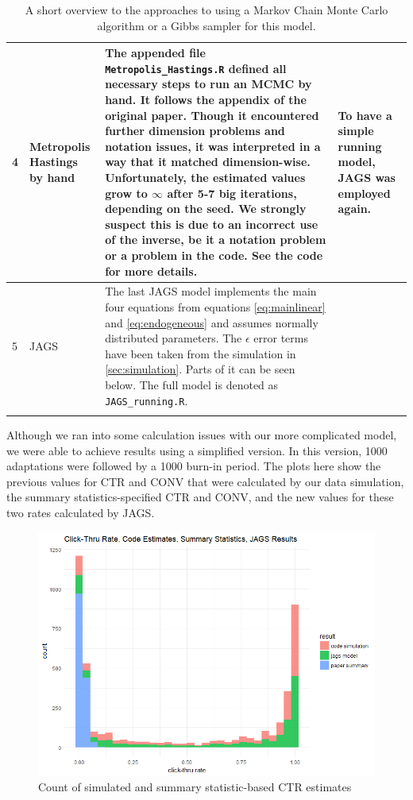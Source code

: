 \begin{longtable}{| p{0.2cm} | p{1.5cm} | p{4.5cm} | p{4.5cm} |}
    \hline
    4 & Metropolis Hastings by hand & The appended file \texttt{Metropolis\_Hastings.R} defined all necessary steps to run an MCMC by hand. It follows the appendix of the original paper. Though it encountered further dimension problems and notation issues, it was interpreted in a way that it matched dimension-wise. Unfortunately, the estimated values grow to $\infty$ after 5-7 big iterations, depending on the seed. We strongly suspect this is due to an incorrect use of the inverse, be it a notation problem or a problem in the code. See the code for more details. & To have a simple running model, JAGS was employed again.\\
    \hline
    5 & JAGS & The last JAGS model implements the main four equations from equations \ref{eq:mainlinear} and \ref{eq:endogeneous} and assumes normally distributed parameters. The $\epsilon$ error terms have been taken from the simulation in \ref{sec:simulation}. Parts of it can be seen below. The full model is denoted as \texttt{JAGS\_running.R}. & \\
    \hline
\caption{A short overview to the approaches to using a Markov Chain Monte Carlo algorithm or a Gibbs sampler for this model.}
\label{table:MCMC} 
\end{longtable}

\newpage


Although we ran into some calculation issues with our more complicated model, we were able to achieve results using a simplified version. In this version, 1000 adaptations were followed by a 1000 burn-in period. The plots here show the previous values for CTR and CONV that were calculated by our data simulation, the summary statistics-specified CTR and CONV, and the new values for these two rates calculated by JAGS.

\begin{figure}[!h]
    \centering
    \includegraphics[scale = 0.55]{ctr_jags_plot.png}
    \caption{Count of simulated and summary statistic-based CTR estimates}
    \label{fig:ctr-jags}
\end{figure}

